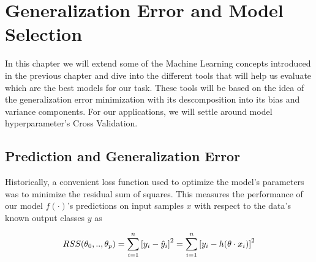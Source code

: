 
\chapter{Generalization Error and Model Selection }\label{ch:modelSelection}


In this chapter we will extend some of the Machine Learning concepts introduced in the previous chapter and dive into the different tools that will help us evaluate which are the best models for our task.
These tools will be based on the idea of the generalization error minimization with its descomposition into its bias and variance components.
For our applications, we will settle around model hyperparameter's Cross Validation.


\section{Prediction and Generalization Error}\label{subsection-generalizationError}

Historically, a convenient loss function used to optimize the model's parameters was to minimize the residual sum of squares.
This measures the performance of our model $f(\cdot)$'s predictions on input samples $x$ with respect to the data's known output classes $y$ as

\begin{equation}
RSS(\theta_0,..,\theta_p) = \sum_{i=1}^n {[y_i - \hat{y}_i ] }^2 \\
= \sum_{i=1}^n  {[y_i - h( \theta \cdot x_i)] }^2
\label{eq:rss}
\end{equation}


